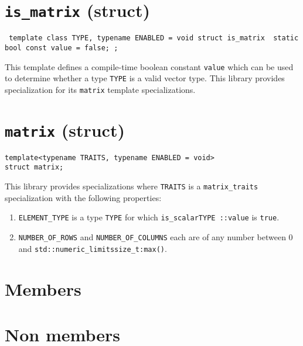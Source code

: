 \documentclass[oneside]{book}
\begin{document}
\section{\texttt{is\_matrix} (struct)}
\texttt{
template \textlangle class TYPE, typename ENABLED = void\textrangle\newline
struct is\_matrix {\newline
  static bool const value = false;\newline
};}

\noindent{}This template defines a compile-time boolean constant \texttt{value}
which can be used to determine whether a type \texttt{TYPE} is a valid vector type.
This library provides specialization for its \texttt{matrix} template specializations.

\section{\texttt{matrix} (struct)}
\begin{verbatim}
template<typename TRAITS, typename ENABLED = void>
struct matrix;
\end{verbatim}
\noindent{}This library provides specializations where \texttt{TRAITS} is a \texttt{matrix\_traits}
specialization with the following properties:
\begin{enumerate}
	\item \texttt{ELEMENT\_TYPE} is a type \texttt{TYPE} for which \texttt{is\_scalar\textlangle TYPE \textrangle::value} is \texttt{true}.
	\item \texttt{NUMBER\_OF\_ROWS} and \texttt{NUMBER\_OF\_COLUMNS} each are of any number between 0 and
	\texttt{std::numeric\_limits\textlangle size\_t\textrangle\::max()}.
\end{enumerate}

\section{Members}

\section{Non members}
\end{document}
